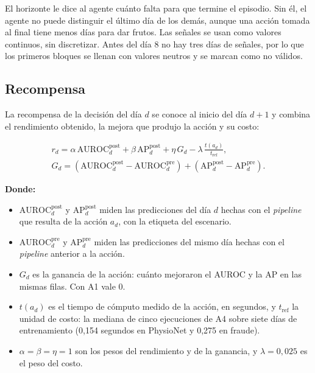 El horizonte le dice al agente cuánto falta para que termine el episodio. Sin él, el agente
no puede distinguir el último día de los demás, aunque una acción tomada al final tiene menos
días para dar frutos. Las señales se usan como valores continuos, sin discretizar. Antes del día
8 no hay tres días de señales, por lo que los primeros bloques se llenan con valores neutros y
se marcan como no válidos.

\subsection{Recompensa}

La recompensa de la decisión del día $d$ se conoce al inicio del día $d+1$ y combina el
rendimiento obtenido, la mejora que produjo la acción y su costo:

\begin{equation}
    \begin{gathered}
    r_d = \alpha\,\text{AUROC}^{\text{post}}_d + \beta\,\text{AP}^{\text{post}}_d
    + \eta\,G_d - \lambda\,\frac{t(a_d)}{t_{\text{ref}}}, \\
    G_d = \left(\text{AUROC}^{\text{post}}_d - \text{AUROC}^{\text{pre}}_d\right)
    + \left(\text{AP}^{\text{post}}_d - \text{AP}^{\text{pre}}_d\right).
    \end{gathered}
    \label{eq:darl_reward}
\end{equation}

\noindent\textbf{Donde:}
\begin{itemize}
    \item $\text{AUROC}^{\text{post}}_d$ y $\text{AP}^{\text{post}}_d$ miden las predicciones del día $d$ hechas con el \textit{pipeline} que resulta de la acción $a_d$, con la etiqueta del escenario.
    \item $\text{AUROC}^{\text{pre}}_d$ y $\text{AP}^{\text{pre}}_d$ miden las predicciones del mismo día hechas con el \textit{pipeline} anterior a la acción.
    \item $G_d$ es la ganancia de la acción: cuánto mejoraron el AUROC y la AP en las mismas filas. Con A1 vale 0.
    \item $t(a_d)$ es el tiempo de cómputo medido de la acción, en segundos, y $t_{\text{ref}}$ la unidad de costo: la mediana de cinco ejecuciones de A4 sobre siete días de entrenamiento (0,154 segundos en PhysioNet y 0,275 en fraude).
    \item $\alpha = \beta = \eta = 1$ son los pesos del rendimiento y de la ganancia, y $\lambda = 0{,}025$ es el peso del costo.
\end{itemize}

